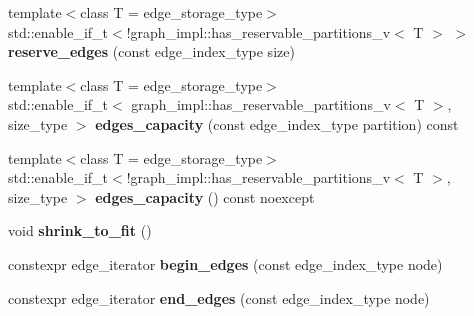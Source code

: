 \begin{DoxyCompactItemize}
\item 
\mbox{\label{classsequoia_1_1maths_1_1graph__primitive_ac713215b452a0e767efee7ecfbe2d8e3}} 
{\footnotesize template$<$class T  = edge\+\_\+storage\+\_\+type$>$ }\\std\+::enable\+\_\+if\+\_\+t$<$!graph\+\_\+impl\+::has\+\_\+reservable\+\_\+partitions\+\_\+v$<$ T $>$ $>$ {\bfseries reserve\+\_\+edges} (const edge\+\_\+index\+\_\+type size)
\item 
\mbox{\label{classsequoia_1_1maths_1_1graph__primitive_aef265e2f84338de576bff365dfe52e87}} 
{\footnotesize template$<$class T  = edge\+\_\+storage\+\_\+type$>$ }\\std\+::enable\+\_\+if\+\_\+t$<$ graph\+\_\+impl\+::has\+\_\+reservable\+\_\+partitions\+\_\+v$<$ T $>$, size\+\_\+type $>$ {\bfseries edges\+\_\+capacity} (const edge\+\_\+index\+\_\+type partition) const
\item 
\mbox{\label{classsequoia_1_1maths_1_1graph__primitive_a5fa56ed62b7c45a8a67837c7349e64ca}} 
{\footnotesize template$<$class T  = edge\+\_\+storage\+\_\+type$>$ }\\std\+::enable\+\_\+if\+\_\+t$<$!graph\+\_\+impl\+::has\+\_\+reservable\+\_\+partitions\+\_\+v$<$ T $>$, size\+\_\+type $>$ {\bfseries edges\+\_\+capacity} () const noexcept
\item 
\mbox{\label{classsequoia_1_1maths_1_1graph__primitive_a162a0acf42cf4dde704be83266266157}} 
void {\bfseries shrink\+\_\+to\+\_\+fit} ()
\item 
\mbox{\label{classsequoia_1_1maths_1_1graph__primitive_a74d9c50e0a0fe43878a3023dd5614c23}} 
constexpr edge\+\_\+iterator {\bfseries begin\+\_\+edges} (const edge\+\_\+index\+\_\+type node)
\item 
\mbox{\label{classsequoia_1_1maths_1_1graph__primitive_a299ddc6843cb0aa648860288734d2c3f}} 
constexpr edge\+\_\+iterator {\bfseries end\+\_\+edges} (const edge\+\_\+index\+\_\+type node)
\item 
\mbox{\label{classsequoia_1_1maths_1_1graph__primitive_afe1b1e38c88094c4ca9837502cff0c52}} 

\end{DoxyCompactItemize}
